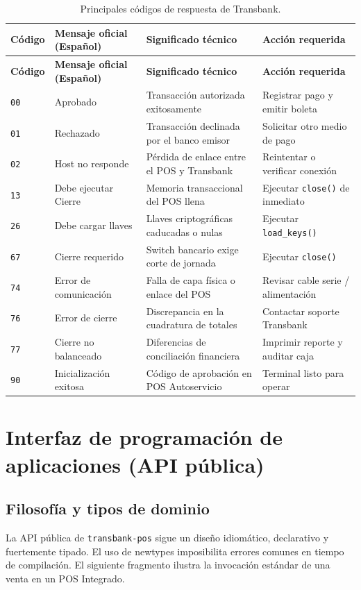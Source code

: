 \documentclass{../../plantilla/raysac-informe}
\begin{document}
\begin{longtable}{@{}p{1.2cm}p{5.5cm}p{4.0cm}p{3.5cm}@{}}
\caption{Principales códigos de respuesta de Transbank.}\label{tab:catalogo-codigos}\\
\toprule
\textbf{Código} & \textbf{Mensaje oficial (Español)} & \textbf{Significado técnico} & \textbf{Acción requerida} \\
\midrule
\endfirsthead
\toprule
\textbf{Código} & \textbf{Mensaje oficial (Español)} & \textbf{Significado técnico} & \textbf{Acción requerida} \\
\midrule
\endhead
\bottomrule
\endlastfoot
\texttt{00} & Aprobado & Transacción autorizada exitosamente & Registrar pago y emitir boleta \\
\texttt{01} & Rechazado & Transacción declinada por el banco emisor & Solicitar otro medio de pago \\
\texttt{02} & Host no responde & Pérdida de enlace entre el POS y Transbank & Reintentar o verificar conexión \\
\texttt{13} & Debe ejecutar Cierre & Memoria transaccional del POS llena & Ejecutar \texttt{close()} de inmediato \\
\texttt{26} & Debe cargar llaves & Llaves criptográficas caducadas o nulas & Ejecutar \texttt{load\_keys()} \\
\texttt{67} & Cierre requerido & Switch bancario exige corte de jornada & Ejecutar \texttt{close()} \\
\texttt{74} & Error de comunicación & Falla de capa física o enlace del POS & Revisar cable serie / alimentación \\
\texttt{76} & Error de cierre & Discrepancia en la cuadratura de totales & Contactar soporte Transbank \\
\texttt{77} & Cierre no balanceado & Diferencias de conciliación financiera & Imprimir reporte y auditar caja \\
\texttt{90} & Inicialización exitosa & Código de aprobación en POS Autoservicio & Terminal listo para operar \\
\end{longtable}

\clearpage
\section{Interfaz de programación de aplicaciones (API pública)}

\subsection{Filosofía y tipos de dominio}
La API pública de \texttt{transbank-pos} sigue un diseño idiomático, declarativo y fuertemente tipado.
El uso de newtypes imposibilita errores comunes en tiempo de compilación. El siguiente fragmento
ilustra la invocación estándar de una venta en un POS Integrado.
\end{document}
